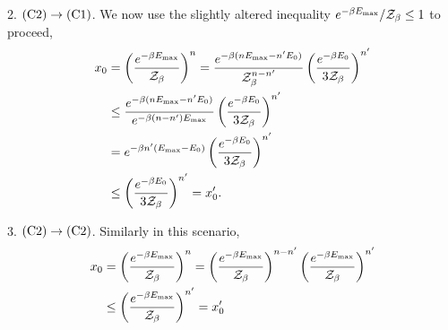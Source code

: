2. $\rm{(C2)} \rightarrow \rm{(C1)}$.
We now use the slightly altered inequality $e^{-\beta E_{\rm{max}}} / \mathcal{Z}_\beta \leq 1$ to proceed,
	\begin{align*}
		x_0 &= \left(\dfrac{e^{-\beta E_{\rm{max}}}}{\mathcal{Z}_\beta}\right)^n = \dfrac{e^{-\beta(n E_{\rm{max}} - n' E_0)}}{\mathcal{Z}_\beta^{n-n'}} \left(\dfrac{e^{-\beta E_0}}{3\mathcal{Z}_\beta}\right)^{n'} \\
		&\leq \dfrac{e^{-\beta(n E_{\rm{max}} - n' E_0)}}{e^{-\beta (n-n') E_{\rm{max}}}} \left(\dfrac{e^{-\beta E_0}}{3\mathcal{Z}_\beta}\right)^{n'} \\
		&= e^{-\beta n' (E_{\rm{max}} - E_0)} \left(\dfrac{e^{-\beta E_0}}{3\mathcal{Z}_\beta}\right)^{n'} \\
		&\leq \left(\dfrac{e^{-\beta E_0}}{3\mathcal{Z}_\beta}\right)^{n'} = x_0'.
	\end{align*}

3. $\rm{(C2)} \rightarrow \rm{(C2)}$.
Similarly in this scenario,
	\begin{align*}
		x_0 &= \left(\dfrac{e^{-\beta E_{\rm{max}}}}{\mathcal{Z}_\beta}\right)^n = \left(\dfrac{e^{-\beta E_{\rm{max}}}}{\mathcal{Z}_\beta}\right)^{n-n'} \left(\dfrac{e^{-\beta E_{\rm{max}}}}{\mathcal{Z}_\beta}\right)^{n'} \\
		&\leq \left(\dfrac{e^{-\beta E_{\rm{max}}}}{\mathcal{Z}_\beta}\right)^{n'} = x_0'	
	\end{align*}



























